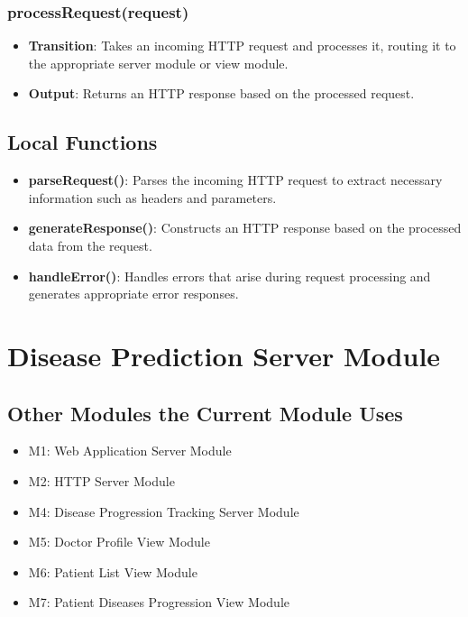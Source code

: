 \documentclass[12pt, titlepage]{article}
\begin{document}
\subsubsection{processRequest(request)}
\begin{itemize}
    \item \textbf{Transition}: Takes an incoming HTTP request and processes it, routing it to the appropriate server module or view module.
    \item \textbf{Output}: Returns an HTTP response based on the processed request.
\end{itemize}

\subsection{Local Functions}
\begin{itemize}
    \item \textbf{parseRequest()}: Parses the incoming HTTP request to extract necessary information such as headers and parameters.
    \item \textbf{generateResponse()}: Constructs an HTTP response based on the processed data from the request.
    \item \textbf{handleError()}: Handles errors that arise during request processing and generates appropriate error responses.
\end{itemize}

\section{Disease Prediction Server Module}

\subsection{Other Modules the Current Module Uses}
\begin{itemize}
    \item M1: Web Application Server Module
    \item M2: HTTP Server Module
    \item M4: Disease Progression Tracking Server Module
    \item M5: Doctor Profile View Module
    \item M6: Patient List View Module
    \item M7: Patient Diseases Progression View Module
\end{itemize}
\end{document}
